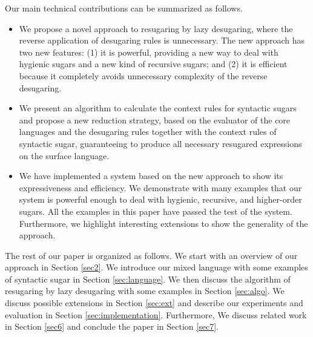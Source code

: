 Our main technical contributions can be summarized as follows.
\begin{itemize}
\item We propose a novel approach to resugaring by lazy desugaring, where the reverse application of desugaring rules is unnecessary. The new approach has two new features: (1) it is powerful, providing a new way to deal with hygienic sugars and a new kind of recursive sugars; and (2) it is efficient because it completely avoids unnecessary complexity of the reverse desugaring.

\item We present an algorithm to calculate the context rules for syntactic sugars and propose a new reduction strategy, based on the evaluator of the core languages and the desugaring rules together with the context rules of syntactic sugar, guaranteeing to produce all necessary resugared expressions on the surface language.

\item We have implemented a system based on the new approach to show its expressiveness and efficiency. We demonstrate with many examples that our system is powerful enough to deal with hygienic, recursive, and higher-order sugars. All the examples in this paper have passed the test of the system. Furthermore, we highlight interesting extensions to show the generality of the approach.


\end{itemize}

The rest of our paper is organized as follows. We start with an overview of our approach in Section \ref{sec2}. We introduce our mixed language with some examples of syntactic sugar in Section \ref{sec:language}. We then discuss the algorithm of resugaring by lazy desugaring with some examples in Section \ref{sec:algo}. We discuss possible extensions in Section \ref{sec:ext} and describe our experiments and evaluation in Section \ref{sec:implementation}. Furthermore,  We discuss related work in Section \ref{sec6} and conclude the paper in Section \ref{sec7}.

